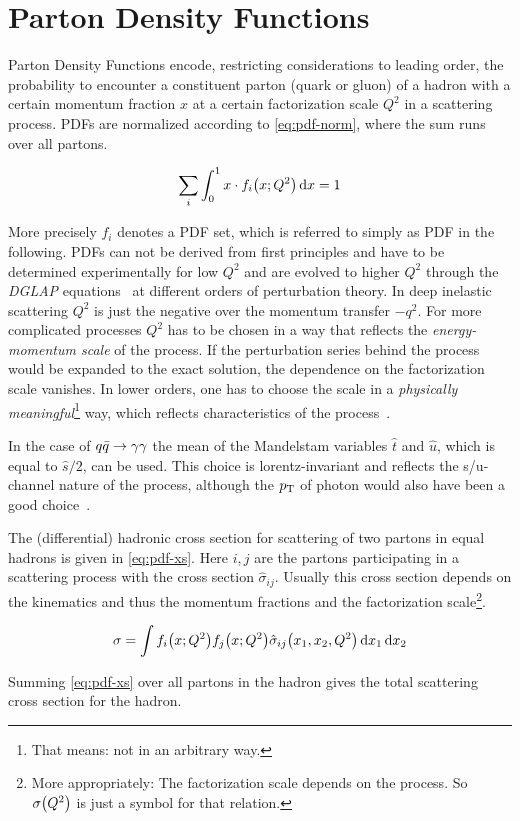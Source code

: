 \section{Parton Density Functions}%
\label{sec:pdf_basics}

Parton Density Functions encode, restricting considerations to leading
order, the probability to encounter a constituent parton (quark or
gluon) of a hadron with a certain momentum fraction \(x\) at a certain
factorization scale \(Q^2\) in a scattering process. PDFs are
normalized according to \cref{eq:pdf-norm}, where the sum runs over
all partons.

\begin{equation}
  \label{eq:pdf-norm}
  \sum_i\int_0^1x\cdot f_i\qty(x;Q^2) \dd{x} = 1
\end{equation}

More precisely \({f_i}\) denotes a PDF set, which is referred to
simply as PDF in the following.  PDFs can not be derived from first
principles and have to be determined experimentally for low \(Q^2\)
and are evolved to higher \(Q^2\) through the \emph{DGLAP}
equations~\cite{altarelli:1977af} at different orders of perturbation
theory.  In deep inelastic scattering \(Q^2\) is just the negative
over the momentum transfer \(-q^2\). For more complicated processes
\(Q^2\) has to be chosen in a way that reflects the
\emph{energy-momentum scale} of the process. If the perturbation
series behind the process would be expanded to the exact solution, the
dependence on the factorization scale vanishes. In lower orders, one
has to choose the scale in a \emph{physically
  meaningful}\footnote{That means: not in an arbitrary way.} way,
which reflects characteristics of the process~\cite{altarelli:1977af}.

In the case of \(q\bar{q}\rightarrow\gamma\gamma\) the mean of the Mandelstam variables
\(\hat{t}\) and \(\hat{u}\), which is equal to \(\hat{s}/2\), can be
used. This choice is lorentz-invariant and reflects the s/u-channel
nature of the process, although the \(p_\mathrm{T}\) of photon would also have
been a good choice~\cite[18]{buckley:2011ge}.

The (differential) hadronic cross section for scattering of two
partons in equal hadrons is given in \cref{eq:pdf-xs}. Here \(i,j\)
are the partons participating in a scattering process with the cross
section \(\hat{\sigma}_{ij}\). Usually this cross section depends on
the kinematics and thus the momentum fractions and the factorization
scale\footnote{More appropriately: The factorization scale depends on
  the process. So \(\sigma\qty(Q^2)\) is just a symbol for that
  relation.}.

\begin{equation}
  \label{eq:pdf-xs}
  \sigma = \int f_i\qty(x;Q^2) f_j\qty(x;Q^2) \hat{\sigma}_{ij}\qty(x_1,
  x_2, Q^2)\dd{x_1}\dd{x_2}
\end{equation}

Summing \cref{eq:pdf-xs} over all partons in the hadron gives
the total scattering cross section for the hadron.

